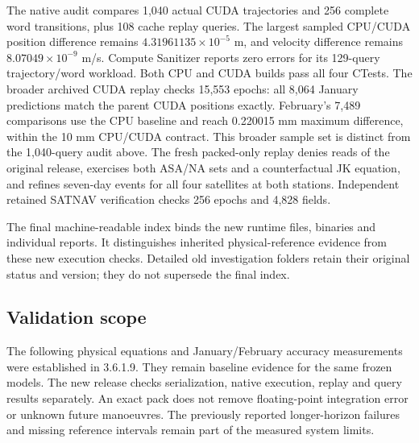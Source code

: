 The native audit compares 1,040 actual CUDA trajectories and 256 complete word
transitions, plus 108 cache replay queries. The largest sampled CPU/CUDA position
difference remains $4.31961135\times10^{-5}$ m, and velocity difference remains
$8.07049\times10^{-9}$ m/s. Compute Sanitizer reports zero errors for its 129-query
trajectory/word workload. Both CPU and CUDA builds pass all four CTests. The broader archived CUDA replay
checks 15,553 epochs: all 8,064 January predictions match the parent CUDA
positions exactly. February's 7,489 comparisons use the CPU baseline and reach
0.220015 mm maximum difference, within the 10 mm CPU/CUDA contract. This broader
sample set is distinct from the 1,040-query audit above.
The fresh packed-only replay denies reads of the original release, exercises
both ASA/NA sets and a counterfactual JK equation, and refines seven-day events
for all four satellites at both stations. Independent retained SATNAV verification
checks 256 epochs and 4,828 fields.

The final machine-readable index  binds the new
runtime files, binaries and individual reports. It distinguishes inherited
physical-reference evidence from these new execution checks. Detailed old
investigation folders retain their original status and version; they do not
supersede the final index.

\subsection{Validation scope}
The following physical equations and January/February accuracy measurements were
established in 3.6.1.9. They remain baseline evidence for the same frozen models.
The new release checks serialization, native execution, replay and query results
separately. An exact pack does not remove floating-point integration error or
unknown future manoeuvres. The previously reported longer-horizon failures and
missing reference intervals remain part of the measured system limits.

